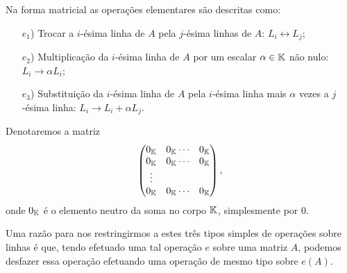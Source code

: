 Na forma matricial as opera\c{c}\~oes elementares s\~ao descritas como:
\begin{itemize}
	\item[$e_1$)] Trocar a $i$-\'esima linha de $A$ pela $j$-\'esima linhas de $A$: $L_i \leftrightarrow L_j$;
	\item[$e_2$)] Multiplica\c{c}\~ao da $i$-\'esima linha de $A$ por um escalar $\alpha \in \mathbb{K}$ n\~ao nulo: $L_i \rightarrow \alpha L_i$;
	\item[$e_3$)] Substitui\c{c}\~ao da $i$-\'esima linha de $A$ pela $i$-\'esima linha mais $\alpha$ vezes a $j$-\'esima linha: $L_i \rightarrow L_i + \alpha L_j$.
\end{itemize}

\begin{observacao}
	Denotaremos a matriz
	\[
		\begin{pmatrix}
			0_{\mathbb{K}} & 0_{\mathbb{K}} \cdots & 0_{\mathbb{K}}\\
			0_{\mathbb{K}} & 0_{\mathbb{K}} \cdots & 0_{\mathbb{K}}\\
			\vdots\\
			0_{\mathbb{K}} & 0_{\mathbb{K}} \cdots & 0_{\mathbb{K}}
		\end{pmatrix},
	\]
	onde $0_{\mathbb{K}}$ \'e o elemento neutro da soma no corpo $\mathbb{K}$, simplesmente por $0$.
\end{observacao}

Uma raz\~ao para nos restringirmos a estes tr\^es tipos simples de opera\c{c}\~oes sobre linhas \'e que, tendo efetuado uma tal opera\c{c}\~ao $e$ sobre uma matriz $A$, podemos desfazer essa opera\c{c}\~ao efetuando uma opera\c{c}\~ao de mesmo tipo sobre $e(A)$.

